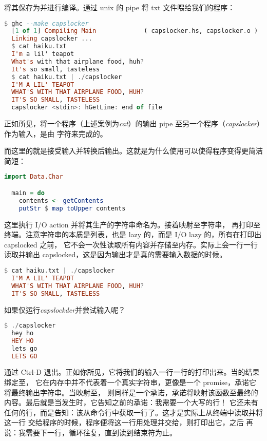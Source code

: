 \documentclass[./main.tex]{subfiles}
\begin{document}
将其保存为并进行编译。通过 unix 的 pipe 将 txt 文件喂给我们的程序：

\begin{lstlisting}[language=Haskell]
  $ ghc --make capslocker
  [1 of 1] Compiling Main             ( capslocker.hs, capslocker.o )
  Linking capslocker ...
  $ cat haiku.txt
  I'm a lil' teapot
  What's with that airplane food, huh?
  It's so small, tasteless
  $ cat haiku.txt | ./capslocker
  I'M A LIL' TEAPOT
  WHAT'S WITH THAT AIRPLANE FOOD, HUH?
  IT'S SO SMALL, TASTELESS
  capslocker <stdin>: hGetLine: end of file
\end{lstlisting}

正如所见，将一个程序（上述案例为\textit{cat}）的输出 pipe 至另一个程序（\textit{capslocker}）作为输入，是由\acode{|}
字符来完成的。

而这里的就是接受输入并转换后输出。这就是为什么使用可以使得程序变得更简洁简短：

\begin{lstlisting}[language=Haskell]
  import Data.Char

  main = do
    contents <- getContents
    putStr $ map toUpper contents
\end{lstlisting}

这里执行 I/O action 并将其生产的字符串命名为。接着映射至字符串，
再打印至终端。注意字符串的本质是列表，也是 lazy 的，而是 I/O lazy 的，所有在打印出 capslocked 之前，
它不会一次性读取所有内容并存储至内存。实际上会一行一行读取并输出 capslocked，这是因为输出才是真的需要输入数据的时候。

\begin{lstlisting}[language=Haskell]
  $ cat haiku.txt | ./capslocker
  I'M A LIL' TEAPOT
  WHAT'S WITH THAT AIRPLANE FOOD, HUH?
  IT'S SO SMALL, TASTELESS
\end{lstlisting}

如果仅运行\textit{capslockder}并尝试输入呢？

\begin{lstlisting}[language=Haskell]
  $ ./capslocker
  hey ho
  HEY HO
  lets go
  LETS GO
\end{lstlisting}

通过 Ctrl-D 退出。正如你所见，它将我们的输入一行一行的打印出来。当的结果绑定至，
它在内存中并不代表着一个真实字符串，更像是一个 promise，承诺它将最终输出字符串。当映射至，
则同样是一个承诺，承诺将映射该函数至最终的内容。最后就是当发生时，它告知之前的承诺：我需要一个大写的行！
它还未有任何的行，而是告知：该从命令行中获取一行了。这才是实际上从终端中读取并将这一行
交给程序的时候，程序便将这一行用处理并交给，则打印出它，之后
再说：我需要下一行，循环往复，直到读到结束符为止。
\end{document}
